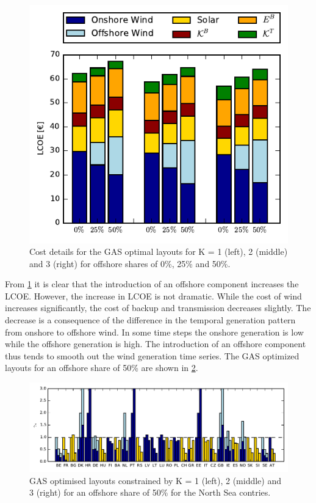 \documentclass[a4paper, 5p, sort&compress]{elsarticle}%
\begin{document}
{\begin{figure}[h!]
  \centering
  \includegraphics[width = \columnwidth]{costOffshoreVE50}
  \caption{Cost details for the GAS optimal layouts for K = 1 (left),
    2 (middle) and 3 (right) for offshore shares of 0\%, 25\% and 50\%.}
  \label{fig:cost-offshore}
\end{figure}

From \cref{fig:cost-offshore} it is clear that the introduction of an
offshore component increases the LCOE. However, the increase in LCOE
is not dramatic. While the cost of wind increases
significantly, the cost of backup and transmission decreases
slightly. The decrease is a consequence of the difference in the
temporal generation pattern from onshore to offshore wind. In some
time steps the onshore generation is low while the offshore generation
is high. The introduction of an offshore component thus tends to
smooth out the wind generation time series. %
The GAS optimized layouts for an offshore share of 50\% are shown in
\cref{fig:layout-offshore}.

\begin{figure}[t!]
  \centering
  \includegraphics[width = 2\columnwidth, center]{offshoreLayouts}
  \caption{GAS optimised layouts constrained by K = 1 (left), 2
    (middle) and 3 (right) for an offshore share of 50\% for the North
    Sea contries.}
  \label{fig:layout-offshore}
\end{figure}

}
\end{document}
